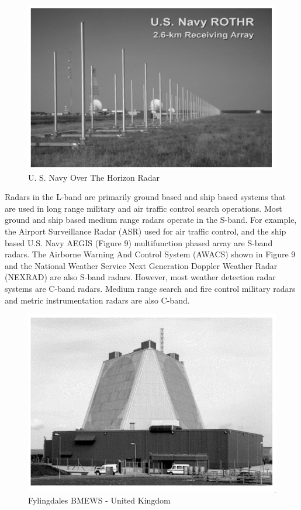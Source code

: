 \documentclass[12pt]{article} %
\begin{document}
 \begin{figure}[H]
  \includegraphics[width=\linewidth]{Horizonradar.png}
  \caption{U. S. Navy Over The Horizon Radar}
  \label{fig:figure 6}
\end{figure}
Radars in the L-band are primarily ground based and ship based systems that are used in long range military and air traffic control search operations. Most ground and ship based medium range radars operate in the S-band. For example, the Airport Surveillance Radar (ASR) used for air traffic control, and the ship based U.S. Navy AEGIS (Figure 9) multifunction phased array are S-band radars. The Airborne Warning And Control System (AWACS) shown in Figure 9 and the National Weather Service Next Generation Doppler Weather Radar (NEXRAD) are also S-band radars. However, most weather detection radar systems are C-band radars. Medium range search and fire control military radars and metric instrumentation radars are also C-band.
 \begin{figure}[H]
   \includegraphics[width=\linewidth]{fylingdales.png}
  \caption{Fylingdales BMEWS - United Kingdom}
  \label{fig:figure 7}
\end{figure}
\end{document}
